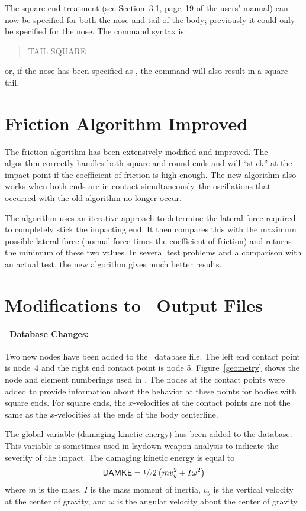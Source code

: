 \begin{memo}
The square end treatment (see Section~3.1, page~19 of the users' manual)
can now be specified for both the nose and tail of the body; previously
it could only be specified for the nose.  The command syntax is:
\begin{quote}
\sf TAIL SQUARE \\
\end{quote}
\rm or, if the nose has been specified as , the  command will also result in a square tail.

\section*{Friction Algorithm Improved}

The friction algorithm has been extensively modified and improved.  The
algorithm correctly handles both square and round ends and will
``stick'' at the impact point if the coefficient of friction is high
enough.  The new algorithm also works when both ends are in contact
simultaneously--the oscillations that occurred with the old algorithm no
longer occur.

The algorithm uses an iterative approach to determine the lateral force
required to completely stick the impacting end.  It then compares this
with the maximum possible lateral force (normal force times the
coefficient of friction) and returns the minimum of these two values. In
several test problems and a comparison with an actual test, the new
algorithm gives much better results.

\section*{Modifications to \slap\ Output Files}

\paragraph*{\exo\ Database Changes:} Two new nodes have been added to
the \exo\ database file.  The left end contact point is node~4 and the
right end contact point is node 5. Figure~\ref{geometry} shows the node
and element numberings used in \slap.  The nodes at the contact points
were added to provide information about the behavior at these points for
bodies with square ends. For square ends, the $x$-velocities at the
contact points are not the same as the $x$-velocities at the ends of the
body centerline.

The global variable  (damaging kinetic energy) has been added
to the database.  This variable is sometimes used in laydown weapon
analysis to indicate the severity of the impact.  The damaging kinetic
energy is equal to
\begin{displaymath}
\cmd{DAMKE} = \sfrac1/2 \left(m v_y^2 + I \omega^2\right)
\end{displaymath}
where $m$ is the mass, $I$ is the mass moment of inertia, $v_y$ is the
vertical velocity at the center of gravity, and $\omega$ is the angular
velocity about the center of gravity.


\end{memo}
